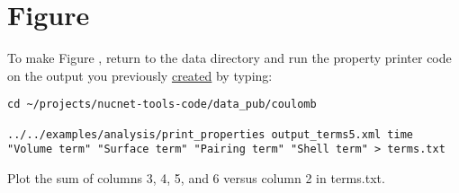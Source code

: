 \section*{Figure }
\hypertarget{sec:strong}{}


\noindent To make Figure ,
return to the data directory and run the property printer code on the
output you previously \hyperlink{sec:ec_time5}{created} by typing:
\begin{verbatim}
cd ~/projects/nucnet-tools-code/data_pub/coulomb

../../examples/analysis/print_properties output_terms5.xml time "Volume term" "Surface term" "Pairing term" "Shell term" > terms.txt
\end{verbatim}
Plot the sum of columns 3, 4, 5, and 6 versus column 2 in {\rm terms.txt}.

\addtocounter{counter}{1}

